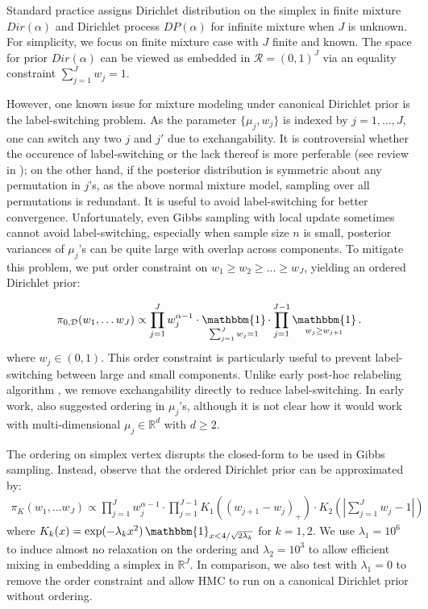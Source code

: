 \documentclass[10pt]{article}
\newcommand{\bb}[1]{\mathbb{#1}}
\newcommand{\mc}[1]{\mathcal{#1}}
\DeclareMathOperator{\1}{\mathbbm{1}}
\begin{document}
Standard practice assigns Dirichlet distribution on the simplex in finite mixture $Dir(\alpha)$ and Dirichlet process $DP(\alpha)$ for infinite mixture when $J$ is unknown. For simplicity, we focus on finite mixture case with $J$ finite and known. The space for prior $Dir(\alpha)$ can be viewed as embedded in $\mc R = (0,1)^J$ via an equality constraint $\sum_{j=1}^J w_j=1$.

However, one known issue for mixture modeling under canonical Dirichlet prior is the label-switching problem. As the parameter $\{\mu_j,w_j\}$ is indexed by $j=1,\ldots,J$, one can switch any two $j$ and $j'$ due to exchangability. It is controversial whether the occurence of label-switching or the lack thereof is more perferable (see review in \cite{jasra2005markov}); on the other hand, if the posterior distribution is symmetric about any permutation in $j$'s, as the above normal mixture model, sampling over all permutations is redundant. It is useful to avoid label-switching for better convergence. Unfortunately, even Gibbs sampling with local update sometimes cannot avoid label-switching, especially when sample size $n$ is small, posterior variances of $\mu_j$'s can be quite large with overlap across components. To mitigate this problem, we put order constraint on $w_1 \ge w_2 \ge \ldots \ge w_J$, yielding an ordered Dirichlet prior:

 \begin{equation*}
\begin{aligned}
\pi_{0, \mc D}(w_1,\ldots w_J) \propto \prod_{j=1}^J w_j^{\alpha-1} \cdot \1_{\sum_{j=1}^J w_j=1} \cdot  \prod_{j=1}^{J-1}\1_{w_j \ge w_{j+1}}.
\end{aligned}
\end{equation*}
where $w_j\in (0,1)$. This order constraint is particularly useful to prevent label-switching between large and small components. Unlike early post-hoc relabeling algorithm \citep{stephens2000dealing}, we remove exchangability directly to reduce label-switching. In early work, \cite{diebolt1994estimation} also suggested ordering in $\mu_j$'s, although it is not clear how it would work with multi-dimensional $\mu_j\in \bb R^d$ with $d\ge 2$. 




The ordering on simplex vertex disrupts the closed-form to be used in Gibbs sampling. Instead, observe that the ordered Dirichlet prior can be approximated by:
 \begin{equation*}
\begin{aligned}
\pi_K(w_1,\ldots w_J) \propto \prod_{j=1}^J w_j^{\alpha-1} \cdot \prod_{j=1}^{J-1} K_{1}{\left(( w_{j+1} - w_j )_+\right)} \cdot K_2 ( |{\sum_{j=1}^J w_j - 1}|)
\end{aligned}
\end{equation*}
where $K_{k}(x)=\exp(- \lambda_k x^2) \1_{x<4/\sqrt{2\lambda_k}}$ for  $k=1,2$. We use $\lambda_1 = 10^6$ to induce almost no relaxation on the ordering and $\lambda_2 = 10^3$ to allow efficient mixing in embedding a simplex in $\mathbb{R}^J$. In comparison, we also test with $\lambda_1=0$ to remove the order constraint and allow HMC to run on a canonical Dirichlet prior without ordering.
\end{document}

